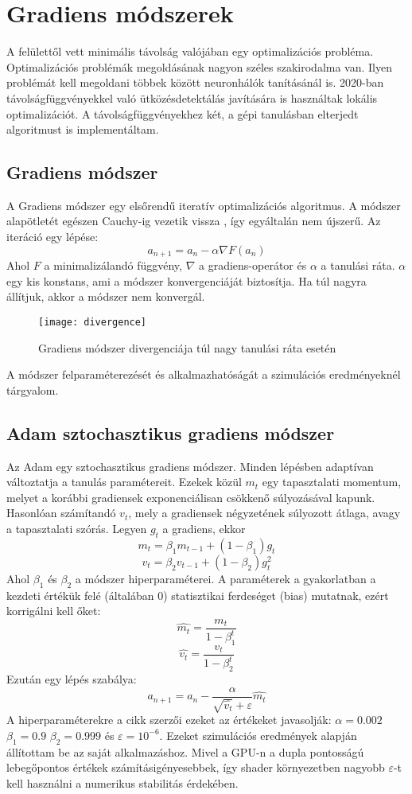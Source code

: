\section{Gradiens módszerek}

A felülettől vett minimális távolság valójában egy optimalizációs probléma. Optimalizációs problémák megoldásának nagyon széles szakirodalma van. Ilyen problémát kell megoldani többek között neuronhálók tanításánál is. 2020-ban távolságfüggvényekkel való ütközésdetektálás javítására is használtak lokális optimalizációt. \cite{locOptSDFCollision} A távolságfüggvényekhez két, a gépi tanulásban elterjedt algoritmust is implementáltam.

\subsection{Gradiens módszer}
A Gradiens módszer egy elsőrendű iteratív optimalizációs algoritmus. A módszer alapötletét egészen Cauchy-ig vezetik vissza \cite{LemarechalOnGrad}, így egyáltalán nem újszerű. Az iteráció egy lépése:
$$ a_{n+1} = a_n - \alpha\nabla F(a_n) $$
Ahol $F$ a minimalizálandó függvény, $\nabla$ a gradiens-operátor és $\alpha$ a tanulási ráta. $\alpha$ egy kis konstans, ami a módszer konvergenciáját biztosítja. Ha túl nagyra állítjuk, akkor a módszer nem konvergál. 
\begin{figure}[H]
	\centering
	\texttt{[image: divergence]}
	\caption{Gradiens módszer divergenciája túl nagy tanulási ráta esetén}
\end{figure}
A módszer felparaméterezését és alkalmazhatóságát a szimulációs eredményeknél tárgyalom.

\subsection{Adam sztochasztikus gradiens módszer}
Az Adam \cite{Adam} egy sztochasztikus gradiens módszer. Minden lépésben adaptívan változtatja a tanulás paramétereit. Ezekek közül $m_t$ egy tapasztalati momentum, melyet a korábbi gradiensek exponenciálisan csökkenő súlyozásával kapunk. Hasonlóan számítandó $v_t$, mely a gradiensek négyzetének súlyozott átlaga, avagy a tapasztalati szórás. Legyen $g_t$ a gradiens, ekkor
$$ m_t = \beta_1 m_{t-1} + (1-\beta_1)g_t $$
$$ v_t = \beta_2 v_{t-1} + (1-\beta_2)g^2_t $$
Ahol $\beta_1$ és $\beta_2$ a módszer hiperparaméterei. A paraméterek a gyakorlatban a kezdeti értékük felé (általában 0) statisztikai ferdeséget (bias) mutatnak, ezért korrigálni kell őket:
$$ \hat{m_t} = \frac{m_t}{1-\beta_1^t} $$
$$ \hat{v_t} = \frac{v_t}{1-\beta_2^t} $$
Ezután egy lépés szabálya:
$$ a_{n+1} = a_n - \frac{\alpha}{\sqrt{\hat{v_t}}+\varepsilon}\hat{m_t} $$
A hiperparaméterekre a cikk szerzői ezeket az értékeket javasolják: $\alpha=0.002$ $\beta_1=0.9$ $\beta_2=0.999$ és $\varepsilon=10^{-6}$. Ezeket szimulációs eredmények alapján állítottam be az saját alkalmazáshoz. Mivel a GPU-n a dupla pontosságú lebegőpontos értékek számításigényesebbek, így shader környezetben nagyobb $\varepsilon$-t kell használni a numerikus stabilitás érdekében.

